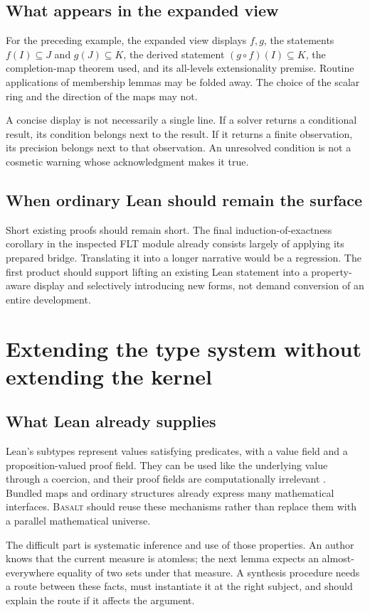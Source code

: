 \documentclass[11pt,a4paper]{article}
\newcommand{\Basalt}{\textsc{Basalt}}
\theoremstyle{plain}
\theoremstyle{definition}
\theoremstyle{remark}
\begin{document}
\subsection{What appears in the expanded view}
For the preceding example, the expanded view displays $f,g$, the statements
$f(I)\subseteq J$ and $g(J)\subseteq K$, the derived statement
$(g\circ f)(I)\subseteq K$, the completion-map theorem used, and its
all-levels extensionality premise. Routine applications of membership lemmas
may be folded away. The choice of the scalar ring and the direction of the
maps may not.

A concise display is not necessarily a single line. If a solver returns a
conditional result, its condition belongs next to the result. If it returns
a finite observation, its precision belongs next to that observation. An
unresolved condition is not a cosmetic warning whose acknowledgment makes
it true.

\subsection{When ordinary Lean should remain the surface}
Short existing proofs should remain short. The final induction-of-exactness
corollary in the inspected FLT module already consists largely of applying
its prepared bridge. Translating it into a longer narrative would be a
regression. The first product should support lifting an existing Lean
statement into a property-aware display and selectively introducing new forms,
not demand conversion of an entire development.

\section{Extending the type system without extending the kernel}
\label{sec:types}
\subsection{What Lean already supplies}
Lean's subtypes represent values satisfying predicates, with a value field
and a proposition-valued proof field. They can be used like the underlying
value through a coercion, and their proof fields are computationally irrelevant
\cite{leansubtypes}. Bundled maps and ordinary structures already express many
mathematical interfaces. \Basalt{} should reuse these mechanisms rather than
replace them with a parallel mathematical universe.

The difficult part is systematic inference and use of those properties.
An author knows that the current measure is atomless; the next lemma expects
an almost-everywhere equality of two sets under that measure. A synthesis
procedure needs a route between these facts, must instantiate it at the right
subject, and should explain the route if it affects the argument.
\end{document}
